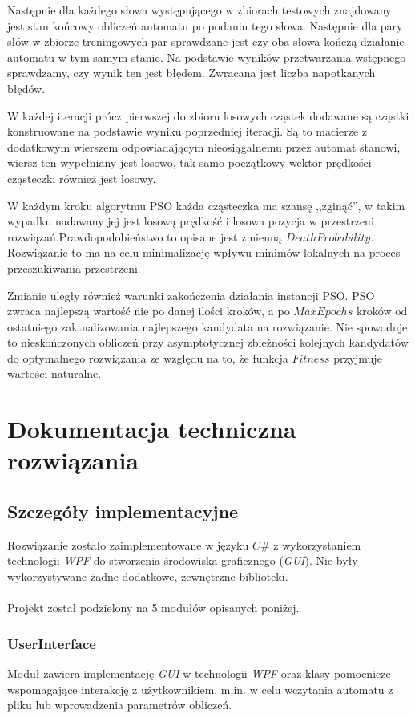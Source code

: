 \documentclass{../llncs_template_final/llncs}
\begin{document}
Następnie dla każdego słowa występującego w zbiorach testowych znajdowany jest stan końcowy obliczeń automatu po podaniu tego słowa. Następnie dla pary słów w zbiorze treningowych par sprawdzane jest czy oba słowa kończą działanie automatu w tym samym stanie. Na podstawie wyników przetwarzania wstępnego sprawdzamy, czy wynik ten jest błędem. Zwracana jest liczba napotkanych błędów. 

W każdej iteracji prócz pierwszej do zbioru losowych cząstek dodawane są cząstki konstruowane na podstawie wyniku poprzedniej iteracji. Są to macierze z dodatkowym wierszem odpowiadającym nieosiągalnemu przez automat stanowi, wiersz ten wypełniany jest losowo, tak samo początkowy wektor prędkości cząsteczki również jest losowy.

W każdym kroku algorytmu PSO każda cząsteczka ma szansę ,,zginąć'', w takim wypadku nadawany jej jest losową prędkość i losowa pozycja w przestrzeni rozwiązań.Prawdopodobieństwo to opisane jest zmienną $DeathProbability$. Rozwiązanie to ma na celu minimalizację wpływu minimów lokalnych na proces przeszukiwania przestrzeni.

\newpage

Zmianie uległy również warunki zakończenia działania instancji PSO. PSO zwraca najlepszą wartość nie po danej ilości kroków, a po $MaxEpochs$ kroków od ostatniego zaktualizowania najlepszego kandydata na rozwiązanie. Nie spowoduje to nieskończonych obliczeń przy asymptotycznej zbieżności kolejnych kandydatów do optymalnego rozwiązania ze względu na to, że funkcja $Fitness$ przyjmuje wartości naturalne.



\section{Dokumentacja techniczna rozwiązania}

\subsection{Szczegóły implementacyjne}

Rozwiązanie zostało zaimplementowane w języku $C\#$ z wykorzystaniem technologii \emph{WPF} do stworzenia środowiska graficznego (\emph{GUI}). Nie były wykorzystywane żadne dodatkowe, zewnętrzne biblioteki.
\\
\\
Projekt został podzielony na 5 modułów opisanych poniżej.

\subsubsection*{UserInterface}
Moduł zawiera implementację \emph{GUI} w technologii \emph{WPF} oraz klasy pomocnicze wspomagające interakcję z użytkownikiem, m.in. w celu wczytania automatu z pliku lub wprowadzenia parametrów obliczeń.
\end{document}
